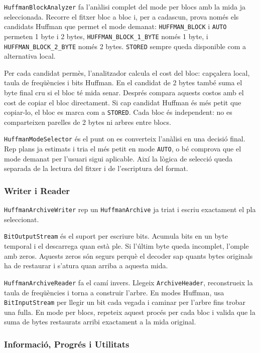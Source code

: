 \documentclass[conference,compsoc]{IEEEtran}
\begin{document}
\texttt{HuffmanBlockAnalyzer} fa l'anàlisi complet del mode per blocs amb
la mida ja seleccionada. Recorre el fitxer bloc a bloc i, per a cadascun,
prova només els candidats Huffman que permet el mode demanat:
\texttt{HUFFMAN\_BLOCK} i \texttt{AUTO} permeten 1 byte i 2 bytes,
\texttt{HUFFMAN\_BLOCK\_1\_BYTE} només 1 byte, i
\texttt{HUFFMAN\_BLOCK\_2\_BYTE} només 2 bytes. \texttt{STORED} sempre
queda disponible com a alternativa local.

Per cada candidat permès, l'analitzador calcula el cost del bloc:
capçalera local, taula de freqüències i bits Huffman. En el candidat de
2 bytes també suma el byte final cru si el bloc té mida senar. Després
compara aquests costos amb el cost de copiar el bloc directament. Si cap
candidat Huffman és més petit que copiar-lo, el bloc es marca com a
\texttt{STORED}. Cada bloc és independent: no es comparteixen parelles de
2 bytes ni arbres entre blocs.

\texttt{HuffmanModeSelector} és el punt on es converteix l'anàlisi en una
decisió final. Rep plans ja estimats i tria el més petit en mode
\texttt{AUTO}, o bé comprova que el mode demanat per l'usuari sigui
aplicable. Així la lògica de selecció queda separada de la lectura del
fitxer i de l'escriptura del format.

\subsubsection{Writer i Reader}

\texttt{HuffmanArchiveWriter} rep un \texttt{HuffmanArchive} ja triat i
escriu exactament el pla seleccionat.

\texttt{BitOutputStream} és el suport per escriure bits. Acumula bits en
un byte temporal i el descarrega quan està ple. Si l'últim byte queda
incomplet, l'omple amb zeros. Aquests zeros són segurs perquè el decoder
sap quants bytes originals ha de restaurar i s'atura quan arriba a aquesta
mida.

\texttt{HuffmanArchiveReader} fa el camí invers. Llegeix
\texttt{ArchiveHeader}, reconstrueix la taula de freqüències i torna a
construir l'arbre. En modes Huffman, usa \texttt{BitInputStream} per
llegir un bit cada vegada i caminar per l'arbre fins trobar una fulla. En
mode per blocs, repeteix aquest procés per cada bloc i valida que la suma
de bytes restaurats arribi exactament a la mida original.

\subsubsection{Informació, Progrés i Utilitats}
\end{document}
